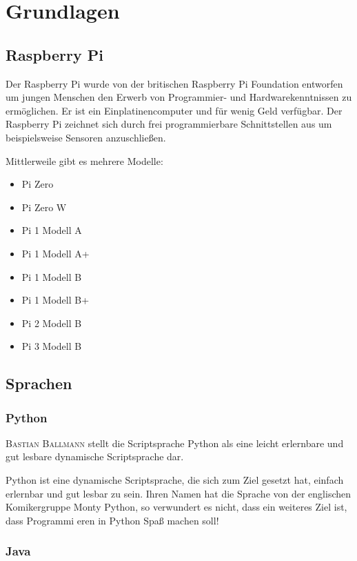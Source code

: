 \chapter{Grundlagen}

\section{Raspberry Pi}
Der Raspberry Pi wurde von der britischen Raspberry Pi Foundation entworfen um
jungen Menschen den Erwerb von Programmier- und Hardwarekenntnissen zu
ermöglichen. Er ist ein Einplatinencomputer und für wenig Geld verfügbar. Der
Raspberry Pi zeichnet sich durch frei programmierbare Schnittstellen aus um
beispielsweise Sensoren anzuschließen.

Mittlerweile gibt es mehrere Modelle:

\begin{itemize} 
\item Pi Zero 
\item Pi Zero W
\item Pi 1 Modell A
\item Pi 1 Modell A+
\item Pi 1 Modell B
\item Pi 1 Modell B+
\item Pi 2 Modell B
\item Pi 3 Modell B 
\end{itemize}


\section{Sprachen}

\subsection{Python}

\textsc{Bastian Ballmann} \cite{Pythonbasics} stellt die Scriptsprache Python
als eine leicht erlernbare und gut lesbare dynamische Scriptsprache dar. 


Python ist eine dynamische Scriptsprache, die sich zum Ziel
gesetzt hat, einfach erlernbar und gut lesbar zu sein. Ihren Namen hat die Sprache
von der englischen Komikergruppe Monty Python, so verwundert es nicht, dass ein
weiteres Ziel ist, dass Programmi
eren in Python Spaß machen soll!
\subsection{Java}


